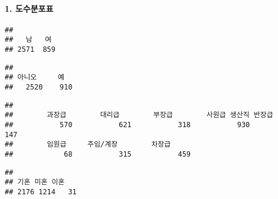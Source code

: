\documentclass[
]{article}
\newenvironment{Shaded}{\begin{snugshade}}{\end{snugshade}}
\newcommand{\FunctionTok}[1]{\textcolor[rgb]{0.13,0.29,0.53}{\textbf{#1}}}
\newcommand{\NormalTok}[1]{#1}
\newcommand{\SpecialCharTok}[1]{\textcolor[rgb]{0.81,0.36,0.00}{\textbf{#1}}}
\begin{document}
\hypertarget{uxb3c4uxc218uxbd84uxd3ecuxd45c}{%
\paragraph{1. 도수분포표}\label{uxb3c4uxc218uxbd84uxd3ecuxd45c}}

\begin{Shaded}
\end{Shaded}

\begin{verbatim}
## 
##   남   여 
## 2571  859
\end{verbatim}

\begin{Shaded}
\end{Shaded}

\begin{verbatim}
## 
## 아니오     예 
##   2520    910
\end{verbatim}

\begin{Shaded}
\end{Shaded}

\begin{verbatim}
## 
##        과장급        대리급        부장급        사원급 생산직 반장급 
##           570           621           318           930           147 
##        임원급     주임/계장        차장급 
##            68           315           459
\end{verbatim}

\begin{Shaded}
\end{Shaded}

\begin{verbatim}
## 
## 기혼 미혼 이혼 
## 2176 1214   31
\end{verbatim}
\end{document}
